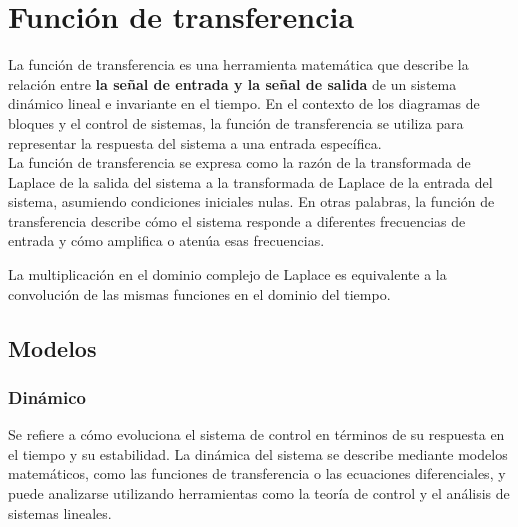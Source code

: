 \documentclass[
	12pt, %
	fleqn, %
	a4paper, %
	oneside, %
]{LegrandOrangeBook}
\begin{document}
\section{Función de transferencia}
La función de transferencia es una herramienta matemática que describe la relación entre \textbf{la señal de entrada y la señal de salida} de un sistema dinámico lineal e invariante en el tiempo. En el contexto de los diagramas de bloques y el control de sistemas, la función de transferencia se utiliza para representar la respuesta del sistema a una entrada específica.\\
La función de transferencia se expresa como la razón de la transformada de Laplace de la salida del sistema a la transformada de Laplace de la entrada del sistema, asumiendo condiciones iniciales nulas. En otras palabras, la función de transferencia describe cómo el sistema responde a diferentes frecuencias de entrada y cómo amplifica o atenúa esas frecuencias.
\begin{remark}
La multiplicación en el dominio complejo de Laplace es equivalente a la convolución de las mismas funciones en el dominio del tiempo.
\end{remark}
\subsection{Modelos}
\subsubsection{Dinámico}
Se refiere a cómo evoluciona el sistema de control en términos de su respuesta en el tiempo y su estabilidad. La dinámica del sistema se describe mediante modelos matemáticos, como las funciones de transferencia o las ecuaciones diferenciales, y puede analizarse utilizando herramientas como la teoría de control y el análisis de sistemas lineales.
\end{document}
